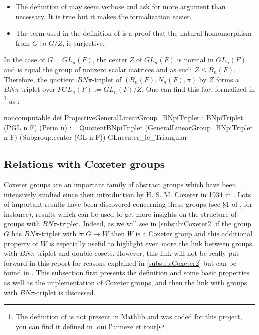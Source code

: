 \begin{commentary}
    \begin{itemize}
        \item
    The definition of  may seem verbose and ask for more argument than necessary. It is true but it makes the formalization easier. 

\item The term   used in the definition of  is a proof that the natural homomorphism from $G$ to $G / Z$,  is surjective.
    \end{itemize}
\end{commentary}


\begin{ex}
    In the case of $G = GL_n(F)$, the center $Z$ of $GL_n(F)$ is normal in $GL_n(F)$ and is equal the group of nonzero scalar matrices and as such $Z \le B_n(F)$. Therefore, the quotient $BN\pi$-triplet of $\left( B_n(F),N_n(F), \pi \right)$ by $Z$ forms a $BN\pi$-triplet over $PGL_n\left( F \right) := GL_n(F)/Z$.
One can find this fact formalized in \footnote{The definition of  is not present in Mathlib and was coded for this project, you can find it defined in \ref{oui l'annexe et tout}} as :
\begin{leancode}
noncomputable
def ProjectiveGeneralLinearGroup_BNpiTriplet : BNpiTriplet (PGL n F) (Perm n) :=
  QuotientBNpiTriplet (GeneralLinearGroup_BNpiTriplet n F) (Subgroup.center (GL n F))  GLncenter_le_Triangular
\end{leancode}  
\end{ex}


\subsection{Relations with Coxeter groups}

    Coxeter groups are an important family of abstract groups which have been intensively studied since their introduction by H. S. M. Coxeter in 1934 in \cite{coxeter_discrete_1934}. 
   Lots of important results have been discovered concerning these groups (see §1 of \cite{bourbaki_groupes_2007}, for instance), results which can be used to get more insights on the structure of groups with $BN\pi$-triplet.
   Indeed, as we will see in \ref{subsub:Coxeter2} if the group $G$ has $BN\pi$-triplet with $\pi : G \to W$ then $W$ is a Coxeter group and this additional property of $W$ is especially useful to highlight even more the link between groups with $BN\pi$-triplet and double cosets. However, this link will not be really put forward in this report for reasons explained in \ref{subsub:Coxeter2} but can be found in \cite{bourbaki_groupes_2007}.
    This subsection first presents the definition and some basic properties as well as the \Lean implementation of Coxeter groups, and then the link with groups with $BN\pi$-triplet is discussed.

